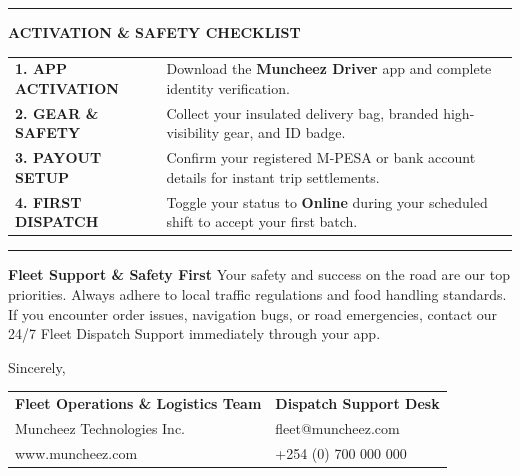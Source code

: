 \documentclass[11pt,a4paper]{article}
\begin{document}
\vspace{0.2cm}

\color{SolidBlack}\hrule height 0.5pt
\vspace{0.25cm}
\textsf{\scriptsize\bfseries\color{LinkBlue}\uppercase{Activation \& Safety Checklist}} \\[0.2cm]

\begin{tabularx}{\textwidth}{@{} p{3.2cm} !{\color{LinkBlue}\vrule width 1.5pt} X @{}}
    \textsf{\small\bfseries\color{SolidBlack} 1. APP ACTIVATION} & \textsf{\small\color{SolidBlack} Download the \textbf{Muncheez Driver} app and complete identity verification.} \\[0.15cm]
    \textsf{\small\bfseries\color{SolidBlack} 2. GEAR \& SAFETY} & \textsf{\small\color{SolidBlack} Collect your insulated delivery bag, branded high-visibility gear, and ID badge.} \\[0.15cm]
    \textsf{\small\bfseries\color{SolidBlack} 3. PAYOUT SETUP} & \textsf{\small\color{SolidBlack} Confirm your registered M-PESA or bank account details for instant trip settlements.} \\[0.15cm]
    \textsf{\small\bfseries\color{SolidBlack} 4. FIRST DISPATCH} & \textsf{\small\color{SolidBlack} Toggle your status to \textbf{Online} during your scheduled shift to accept your first batch.} \\
\end{tabularx}

\vspace{0.25cm}
\color{SolidBlack}\hrule height 0.5pt
\vspace{0.3cm}

\textsf{\small\bfseries\color{SolidBlack} Fleet Support \& Safety First} \newline
\textsf{\small\color{SolidBlack} Your safety and success on the road are our top priorities. Always adhere to local traffic regulations and food handling standards. If you encounter order issues, navigation bugs, or road emergencies, contact our 24/7 Fleet Dispatch Support immediately through your app.}

\vspace{0.6cm}

Sincerely,

\vspace{0.6cm}

\begin{tabularx}{\textwidth}{@{} X >{\raggedleft\arraybackslash}X @{}}
    \textsf{\small\bfseries\color{SolidBlack} Fleet Operations \& Logistics Team} & \textsf{\small\bfseries\color{SolidBlack} Dispatch Support Desk} \\
    \textsf{\small\color{SolidBlack} Muncheez Technologies Inc.} & \textsf{\small\color{LinkBlue} fleet@muncheez.com} \\
    \textsf{\scriptsize\color{LinkBlue} www.muncheez.com} & \textsf{\small\color{SolidBlack} +254 (0) 700 000 000} \\
\end{tabularx}
\end{document}
